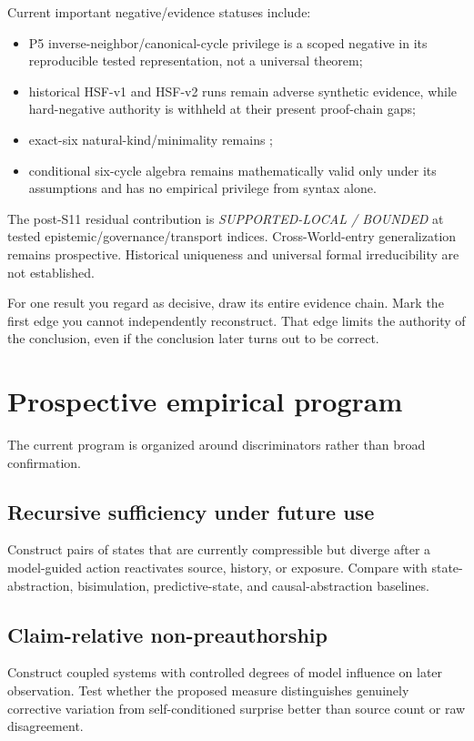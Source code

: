 Current important negative/evidence statuses include:
\begin{itemize}
\item P5 inverse-neighbor/canonical-cycle privilege is a scoped negative in its reproducible tested representation, not a universal theorem;
\item historical HSF-v1 and HSF-v2 runs remain adverse synthetic evidence, while hard-negative authority is withheld at their present proof-chain gaps;
\item exact-six natural-kind/minimality remains \withhold;
\item conditional six-cycle algebra remains mathematically valid only under its assumptions and has no empirical privilege from syntax alone.
\end{itemize}

The post-S11 residual contribution is \emph{SUPPORTED-LOCAL / BOUNDED} at tested epistemic/governance/transport indices. Cross-World-entry generalization remains prospective. Historical uniqueness and universal formal irreducibility are not established.

\begin{readercheck}
For one result you regard as decisive, draw its entire evidence chain. Mark the first edge you cannot independently reconstruct. That edge limits the authority of the conclusion, even if the conclusion later turns out to be correct.
\end{readercheck}

\section{Prospective empirical program}

The current program is organized around discriminators rather than broad confirmation.

\subsection{Recursive sufficiency under future use}
Construct pairs of states that are currently compressible but diverge after a model-guided action reactivates source, history, or exposure. Compare with state-abstraction, bisimulation, predictive-state, and causal-abstraction baselines.

\subsection{Claim-relative non-preauthorship}
Construct coupled systems with controlled degrees of model influence on later observation. Test whether the proposed measure distinguishes genuinely corrective variation from self-conditioned surprise better than source count or raw disagreement.


